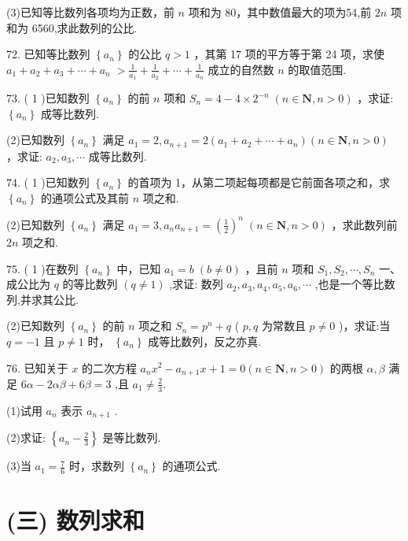 \documentclass[10pt]{article}
\begin{document}
(3)已知等比数列各项均为正数，前 \(n\) 项和为 80，其中数值最大的项为54,前 \({2n}\) 项和为 6560,求此数列的公比.

72. 已知等比数列 \(\left\{  {a}_{n}\right\}\) 的公比 \(q > 1\) ，其第 17 项的平方等于第 24 项，求使 \({a}_{1} + {a}_{2} + {a}_{3} + \cdots  + {a}_{n} \; > \frac{1}{{a}_{1}} + \frac{1}{{a}_{2}} + \cdots  + \frac{1}{{a}_{n}}\) 成立的自然数 \(n\) 的取值范围.

73. ( 1 )已知数列 \(\left\{  {a}_{n}\right\}\) 的前 \(n\) 项和 \({S}_{n} = 4 - 4 \times  {2}^{-n}\;\left( {n \in  \mathbf{N},n > 0}\right)\) ，求证: \(\left\{  {a}_{n}\right\}\) 成等比数列.

(2)已知数列 \(\left\{  {a}_{n}\right\}\) 满足 \({a}_{1} = 2,{a}_{n + 1} = 2\left( {{a}_{1} + {a}_{2} + \cdots  + {a}_{n}}\right) \left( {n \in  \mathbf{N},n > 0}\right)\) ，求证: \({a}_{2},{a}_{3},\cdots\) 成等比数列.

74. ( 1 )已知数列 \(\left\{  {a}_{n}\right\}\) 的首项为 1，从第二项起每项都是它前面各项之和，求 \(\left\{  {a}_{n}\right\}\) 的通项公式及其前 \(n\) 项之和.

(2)已知数列 \(\left\{  {a}_{n}\right\}\) 满足 \({a}_{1} = 3,{a}_{n}{a}_{n + 1} = {\left( \frac{1}{2}\right) }^{n}\;\left( {n \in  \mathbf{N},n > 0}\right)\) ，求此数列前 \({2n}\) 项之和.

75. ( 1 )在数列 \(\left\{  {a}_{n}\right\}\) 中，已知 \({a}_{1} = b\;\left( {b \neq  0}\right)\) ，且前 \(n\) 项和 \({S}_{1},{S}_{2},\cdots ,{S}_{n}\) 一、成公比为 \(q\) 的等比数列 \(\left( {q \neq  1}\right)\) ,求证: 数列 \({a}_{2},{a}_{3},{a}_{4},{a}_{5},{a}_{6},\cdots\) ,也是一个等比数列,并求其公比.

(2)已知数列 \(\left\{  {a}_{n}\right\}\) 的前 \(n\) 项之和 \({S}_{n} = {p}^{n} + q\) ( \(p,q\) 为常数且 \(p \neq  0\) )，求证:当 \(q =  - 1\) 且 \(p \neq  1\) 时， \(\left\{  {a}_{n}\right\}\) 成等比数列，反之亦真.

76. 已知关于 \(x\) 的二次方程 \({a}_{n}{x}^{2} - {a}_{n + 1}x + 1 = 0\left( {n \in  \mathbf{N},n > 0}\right)\) 的两根 \(\alpha ,\beta\) 满足 \({6\alpha } - {2\alpha \beta } + {6\beta } = 3\) ,且 \({a}_{1} \neq  \frac{2}{3}.\)

(1)试用 \({a}_{n}\) 表示 \({a}_{n + 1}\) .

(2)求证: \(\left\{  {{a}_{n} - \frac{2}{3}}\right\}\) 是等比数列.

(3)当 \({a}_{1} = \frac{7}{6}\) 时，求数列 \(\left\{  {a}_{n}\right\}\) 的通项公式.

\section*{(三) 数列求和}
\end{document}
